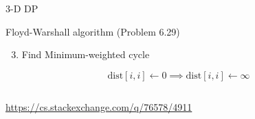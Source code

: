 \begin{frame}{3-D DP}
  \begin{exampleblock}{Floyd-Warshall algorithm (Problem 6.29)}
	\begin{enumerate}[(1)]
	  \setcounter{enumi}{2}
	  \item Find Minimum-weighted cycle
	\end{enumerate}
  \end{exampleblock}

  \[
	\text{dist}[i,i] \gets 0 \implies \text{dist}[i,i] \gets \infty 
  \]

  \begin{columns}
  \end{columns}

  \centerline{\url{https://cs.stackexchange.com/q/76578/4911}}
\end{frame}
